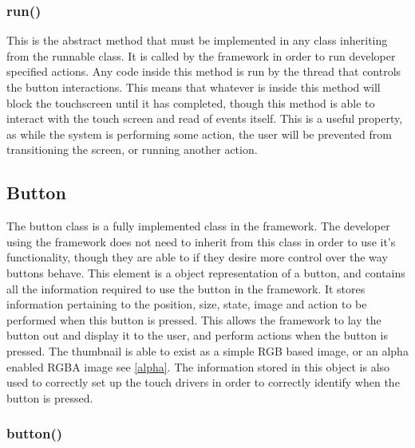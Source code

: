 \subsubsection{run()}

This is the abstract method that must be implemented in any class inheriting from the runnable class. It is called by the framework in order to run developer specified actions. Any code inside this method is run by the thread that controls the button interactions. This means that whatever is inside this method will block the touchscreen until it has completed, though this method is able to interact with the touch screen and read of events itself. This is a useful property, as while the system is performing some action, the user will be prevented from transitioning the screen, or running another action. 

\subsection{Button}
\label{sec:button}

The button class is a fully implemented class in the framework. The developer using the framework does not need to inherit from this class in order to use it's functionality, though they are able to if they desire more control over the way buttons behave. This element is a object representation of a button, and contains all the information required to use the button in the framework. It stores information pertaining to the position, size, state, image and action to be performed when this button is pressed. This allows the framework to lay the button out and display it to the user, and perform actions when the button is pressed. The thumbnail is able to exist as a simple RGB based image, or an alpha enabled RGBA image see \ref{alpha}. The information stored in this object is also used to correctly set up the touch drivers in order to correctly identify when the button is pressed.

\subsubsection{button()}

